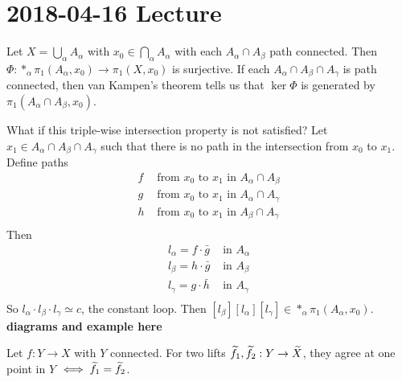 \section{2018-04-16 Lecture}

\begin{rmk}
	Let $X = \bigcup_\alpha A_\alpha$ with $x_0 \in \bigcap_\alpha A_\alpha$ with each $A_\alpha \cap A_\beta$ path connected.
	Then $\Phi: *_\alpha \pi_1(A_\alpha,x_0) \to \pi_1(X,x_0)$ is surjective.
	If each $A_\alpha \cap A_\beta \cap A_\gamma$ is path connected, then van Kampen's theorem tells us that $\ker\Phi$ is generated by $\pi_1(A_\alpha \cap A_\beta, x_0)$.
	
	What if this triple-wise intersection property is not satisfied?
	Let $x_1 \in A_\alpha \cap A_\beta \cap A_\gamma$ such that there is no path in the intersection from $x_0$ to $x_1$.
	Define paths
	\begin{align*}
		f &\text{ from } x_0 \text{ to } x_1 \text{ in } A_\alpha \cap A_\beta \\
		g &\text{ from } x_0 \text{ to } x_1 \text{ in } A_\alpha \cap A_\gamma \\
		h &\text{ from } x_0 \text{ to } x_1 \text{ in } A_\beta \cap A_\gamma \\
	\end{align*}
	Then
	\begin{align*}
		l_\alpha = f \cdot \bar g &\text{ in } A_\alpha \\
		l_\beta = h \cdot \bar g &\text{ in } A_\beta \\
		l_\gamma = g \cdot \bar h &\text{ in } A_\gamma \\
	\end{align*}
	So $l_\alpha \cdot l_\beta \cdot l_\gamma \simeq c$, the constant loop.
	Then $[l_\beta][l_\alpha][l_\gamma] \in *_\alpha \pi_1(A_\alpha,x_0)$.
	\textbf{diagrams and example here}
\end{rmk}

\begin{prop}
	Let $f: Y \to X$ with $Y$ connected.
	For two lifts $\widetilde f_1, \widetilde f_2: Y \to \widetilde X$, they agree at one point in $Y$ $ \iff \widetilde f_1 = \widetilde f_2$.
\end{prop}

